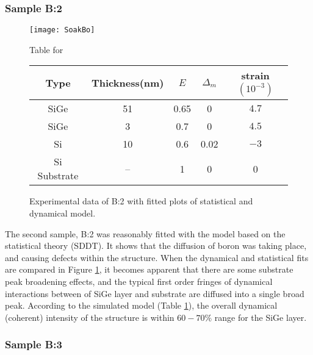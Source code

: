 \subsubsection{Sample B:2}
%
\begin{figure}[ht]%
\caption{Experimental data of B:2 with fitted plots of statistical and dynamical model.}
\label{B2:fig}
\begin{minipage}{\linewidth}
\texttt{[image: SoakBo]}
\end{minipage}
\begin{minipage}{\linewidth}
\vspace{10pt}
\centering
Table for \\
\begin{tabular}[htbp]{@{}c|cccc@{}}
    \hline
  Type & Thickness(nm) & $E$ & $\Delta_m$ & strain $(10^{-3})$ \\
    \hline
  SiGe & 51 & 0.65 & 0 & $4.7 $  \\
  SiGe & 3 & 0.7 & 0 & $4.5 $  \\
  Si   & 10 & 0.6 & 0.02 & $-3$ \\
  Si Substrate & -- & 1 & 0 & 0 
  \end{tabular}
  \end{minipage}
\end{figure}
%
The second sample, B:2 was reasonably fitted with the model based on the statistical theory (SDDT).  It shows that the diffusion of boron was taking place, and causing defects within the structure.  When the dynamical and statistical fits are compared in Figure \ref{B2:fig}, it becomes apparent that there are some substrate peak broadening effects, and the typical first order fringes of dynamical interactions between of SiGe layer and substrate are diffused into a single broad peak.  According to the simulated model (Table \ref{B2:fig}), the overall dynamical (coherent) intensity of the structure is within $60-70\%$ range for the SiGe layer. 


\subsubsection{Sample B:3}

